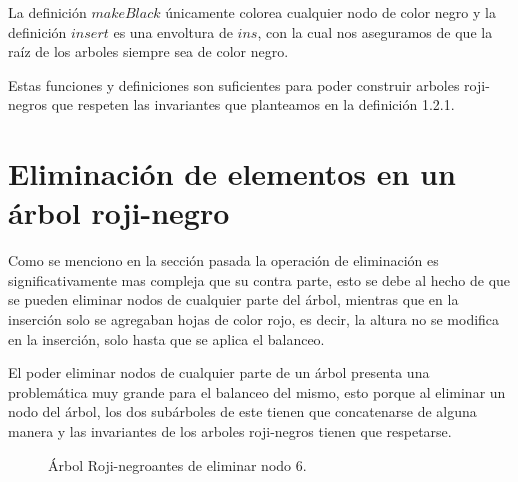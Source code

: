 \documentclass[8pt,leqno,pdflatex,spanish]{book}
\newcommand{\Arn}{Árbol Roji-negro}
\newcommand{\arn}{árbol roji-negro}
\newcommand{\arns}{arboles roji-negros}
\theoremstyle{plain}
\theoremstyle{definition}
\theoremstyle{remark}
\begin{document}
La definici\'on $makeBlack$ únicamente colorea cualquier nodo de color negro y la definición 
$insert$ es una envoltura de $ins$, con la cual nos aseguramos de que la ra\'iz de los arboles 
siempre sea de color negro.

Estas funciones y definiciones son suficientes para poder construir {\arns} que respeten las 
invariantes que planteamos en la definici\'on 1.2.1. 

\section{Eliminación de elementos en un {\arn}}

Como se menciono en la secci\'on pasada la operaci\'on de eliminaci\'on es significativamente mas 
compleja que su contra parte, esto se debe al hecho de que se pueden eliminar nodos de cualquier 
parte del \'arbol, mientras que en la inserci\'on solo se agregaban hojas de color rojo, es decir, 
la altura no se modifica en la inserción\cite{RBTypes}, solo hasta que se aplica el balanceo.

El poder eliminar nodos de cualquier parte de un \'arbol presenta una problemática muy grande para 
el balanceo del mismo, esto porque al eliminar un nodo del \'arbol, los dos subárboles de este 
tienen que concatenarse de alguna manera y las invariantes de los {\arns} tienen que respetarse.

\begin{figure}
\centering 
\captionsetup{justification=centering}
\label{arbolRB}
\caption{{\Arn antes de eliminar nodo 6.}}
\end{figure}
\end{document}
